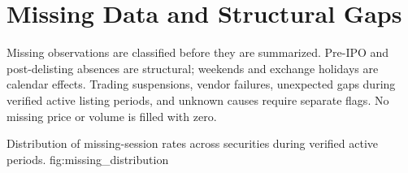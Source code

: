 \section{Missing Data and Structural Gaps}

Missing observations are classified before they are summarized. Pre-IPO and
post-delisting absences are structural; weekends and exchange holidays are
calendar effects. Trading suspensions, vendor failures, unexpected gaps during
verified active listing periods, and unknown causes require separate flags.
No missing price or volume is filled with zero.



  {Distribution of missing-session rates across securities during verified active periods.}
  {fig:missing_distribution}

